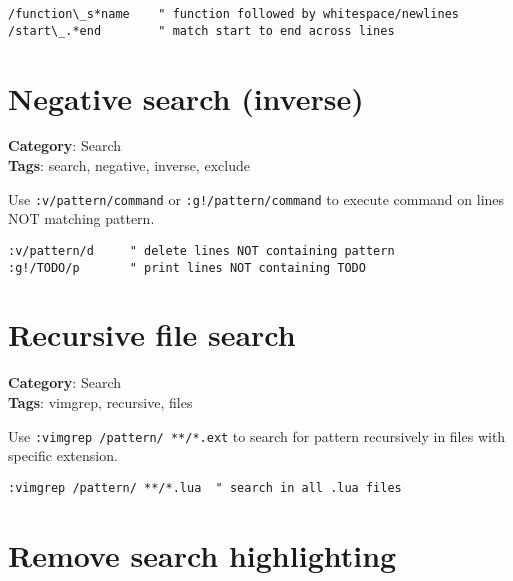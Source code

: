 {{{{{{{{{{{{{\begin{Exa*}{}
\begin{Verbatim}[fontsize=\footnotesize, breaklines, breakanywhere]
/function\_s*name    " function followed by whitespace/newlines
/start\_.*end        " match start to end across lines
\end{Verbatim}
\end{Exa*}

\section{Negative search (inverse)}

\textbf{Category}: Search\\ \textbf{Tags}: search, negative, inverse, exclude
\vspace{0.5cm}

Use {\footnotesize \Verb§:v/pattern/command§} or {\footnotesize \Verb§:g!/pattern/command§} to execute command on lines NOT matching pattern.

\begin{Exa*}{}
\begin{Verbatim}[fontsize=\footnotesize, breaklines, breakanywhere]
:v/pattern/d     " delete lines NOT containing pattern
:g!/TODO/p       " print lines NOT containing TODO
\end{Verbatim}
\end{Exa*}

\section{Recursive file search}

\textbf{Category}: Search\\ \textbf{Tags}: vimgrep, recursive, files
\vspace{0.5cm}

Use {\footnotesize \Verb§:vimgrep /pattern/ **/*.ext§} to search for pattern recursively in files with specific extension.

\begin{Exa*}{}
\begin{Verbatim}[fontsize=\footnotesize, breaklines, breakanywhere]
:vimgrep /pattern/ **/*.lua  " search in all .lua files
\end{Verbatim}
\end{Exa*}

\section{Remove search highlighting}

}}}}}}}}}}}}}
